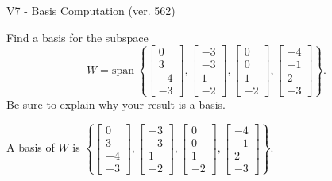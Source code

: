 \begin{exercise}
  \begin{exerciseTitle}V7 - Basis Computation (ver. 562)\end{exerciseTitle}
  \begin{exerciseStatement}
    Find a basis for the subspace 
\[W=\mathrm{span}\ \left\{\left[\begin{array}{r}
0 \\
3 \\
-4 \\
-3
\end{array}\right] , \left[\begin{array}{r}
-3 \\
-3 \\
1 \\
-2
\end{array}\right] , \left[\begin{array}{r}
0 \\
0 \\
1 \\
-2
\end{array}\right] , \left[\begin{array}{r}
-4 \\
-1 \\
2 \\
-3
\end{array}\right]\right\}.\]
 Be sure to explain why your result is a basis.


  \end{exerciseStatement}
  \begin{exerciseAnswer}
   A basis of \(W\) is  \(\left\{\left[\begin{array}{r}
0 \\
3 \\
-4 \\
-3
\end{array}\right] , \left[\begin{array}{r}
-3 \\
-3 \\
1 \\
-2
\end{array}\right] , \left[\begin{array}{r}
0 \\
0 \\
1 \\
-2
\end{array}\right] , \left[\begin{array}{r}
-4 \\
-1 \\
2 \\
-3
\end{array}\right]\right\}\).
  


  \end{exerciseAnswer}
\end{exercise}